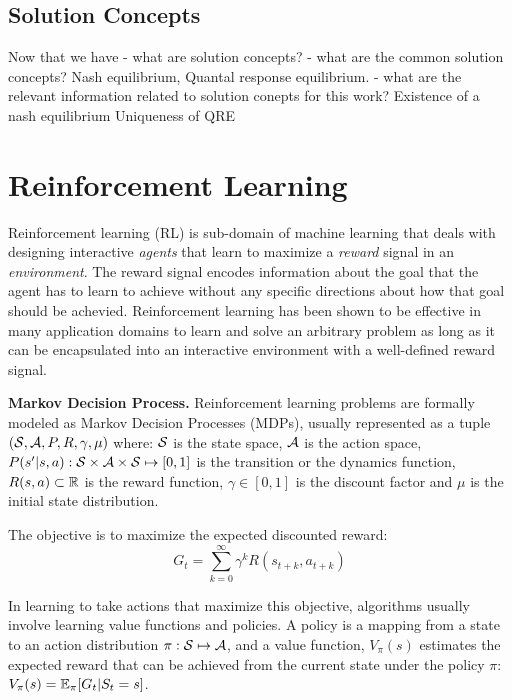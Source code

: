 \subsection{Solution Concepts}

Now that we have - what are solution concepts?
- what are the common solution concepts?
Nash equilibrium, Quantal response equilibrium.
- what are the relevant information related to solution conepts for this work?
Existence of a nash equilibrium Uniqueness of QRE

\section{Reinforcement
  Learning} Reinforcement learning (RL) is sub-domain of machine learning that deals with designing
interactive \textit{agents} that learn to maximize a \textit{reward} signal in an
\textit{environment}.
The reward signal encodes information about the goal that the agent has to learn to achieve without
any specific directions about how that goal should be achevied.
Reinforcement learning has been shown to be effective in many application domains to learn and
solve an arbitrary problem as long as it can be encapsulated into an interactive environment with a
well-defined reward signal.

\textbf{Markov Decision Process.}
Reinforcement learning problems are formally modeled as Markov Decision Processes (MDPs), usually
represented as a tuple $(\mathcal{S}, \mathcal{A}, P, R, \gamma, \mu)$ where: $\mathcal{S}$ is the state space,
$\mathcal{A}$ is the action space, $P(s'|s,a): \mathcal{S} \times \mathcal{A} \times \mathcal{S} \mapsto [0, 1]$ is the
transition or the dynamics function, $R(s,a) \subset \mathbb{R}$ is the reward function, $\gamma \in [0,1]$
is the discount factor and $\mu$ is the initial state distribution.

The objective is to maximize the expected discounted reward:
\begin{equation}
	\label{eqn:rlobj} G_t
	= \sum_{k=0}^{\infty} \gamma^k R(s_{t+k}, a_{t+k})
\end{equation}

In learning
to take actions that maximize this objective, algorithms usually involve learning value functions
and policies.
A policy is a mapping from a state to an action distribution $\pi: \mathcal{S} \mapsto \mathcal{A}$, and a
value function, $V_{\pi}(s)$ estimates the expected reward that can be achieved from the current
state under the policy $\pi$: $V_{\pi}(s) = \mathbb{E}_{\pi}[G_t | S_t = s]$.

